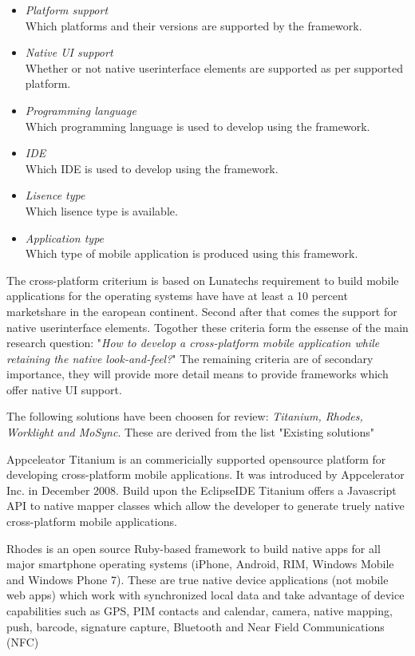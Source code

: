\begin{itemize}
\item \emph{Platform support}\\
Which platforms and their versions are supported by the framework.
\item \emph{Native UI support}\\
Whether or not native userinterface elements are supported as per supported platform.
\item \emph{Programming language}\\
Which programming language is used to develop using the framework.
\item \emph{IDE}\\
Which IDE is used to develop using the framework.
\item \emph{Lisence type}\\
Which lisence type is available.
\item \emph{Application type}\\
Which type of mobile application is produced using this framework.
\end{itemize}

The cross-platform criterium is based on Lunatechs requirement to build mobile applications for the operating systems have have at least a 10 percent marketshare in the earopean continent. Second after that comes the support for native userinterface elements. Togother these criteria form the essense of the main research question: "\emph{How to develop a cross-platform mobile application while retaining the native look-and-feel?}"
The remaining criteria are of secondary importance, they will provide more detail means to provide frameworks which offer native UI support.

The following solutions have been choosen for review: \emph{Titanium, Rhodes, Worklight and MoSync}. These are derived from the list "Existing solutions" %


Appceleator Titanium is an commericially supported opensource platform for developing cross-platform mobile applications. It was introduced by Appcelerator Inc. in December 2008. Build upon the EclipseIDE Titanium offers a Javascript API to native mapper classes which allow the developer to generate truely native cross-platform mobile applications.

Rhodes is an open source Ruby-based framework to build native apps for all major smartphone operating systems (iPhone, Android, RIM, Windows Mobile and Windows Phone 7). These are true native device applications (not mobile web apps) which work with synchronized local data and take advantage of device capabilities such as GPS, PIM contacts and calendar, camera, native mapping, push, barcode, signature capture, Bluetooth and Near Field Communications (NFC)

